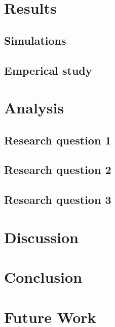 \documentclass{book}
\begin{document}
\chapter{Results}
\section{Simulations}
\section{Emperical study}
\chapter{Analysis}
\section{Research question 1}
\section{Research question 2}
\section{Research question 3}
\chapter{Discussion}
\chapter{Conclusion}
\chapter{Future Work}
\end{document}
